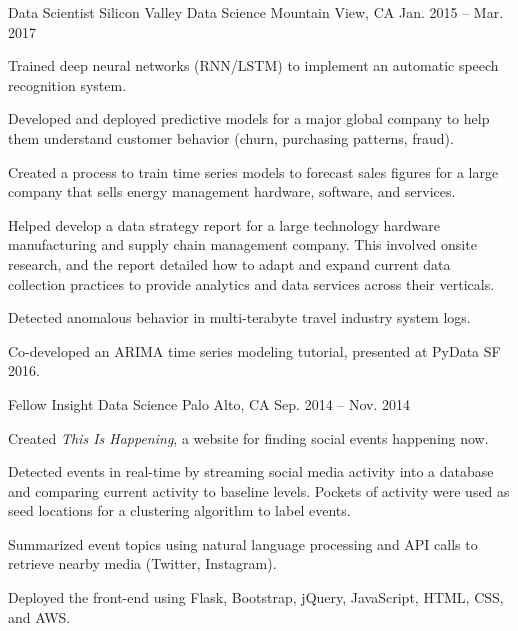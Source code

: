 \begin{cventries}
  \cventry
    {Data Scientist} %
    {Silicon Valley Data Science} %
    {Mountain View, CA} %
    {Jan. 2015 -- Mar. 2017} %
    {
      \begin{cvitems} %
        \item {Trained deep neural networks (RNN/LSTM) to implement an automatic speech recognition system.}
        \item {Developed and deployed predictive models for a major global company to help them understand customer behavior (churn, purchasing patterns, fraud).}
        \item {Created a process to train time series models to forecast sales figures for a large company that sells energy management hardware, software, and services.}
        \item {Helped develop a data strategy report for a large technology hardware manufacturing and supply chain management company. This involved onsite research, and the report detailed how to adapt and expand current data collection practices to provide analytics and data services across their verticals.}
        \item {Detected anomalous behavior in multi-terabyte travel industry system logs.}
        \item {Co-developed an ARIMA time series modeling tutorial, presented at PyData SF 2016.}
      \end{cvitems}
    }

  \cventry
    {Fellow} %
    {Insight Data Science} %
    {Palo Alto, CA} %
    {Sep. 2014 -- Nov. 2014} %
    {
      \begin{cvitems} %
        \item {Created \textit{This Is Happening}, a website for finding social events happening now.}
        \item {Detected events in real-time by streaming social media activity into a database and comparing current activity to baseline levels.  Pockets of activity were used as seed locations for a clustering algorithm to label events.}
        \item {Summarized event topics using natural language processing and API calls to retrieve nearby media (Twitter, Instagram).}
        \item {Deployed the front-end using Flask, Bootstrap, jQuery, JavaScript, HTML, CSS, and AWS.}
      \end{cvitems}
    }


\end{cventries}
